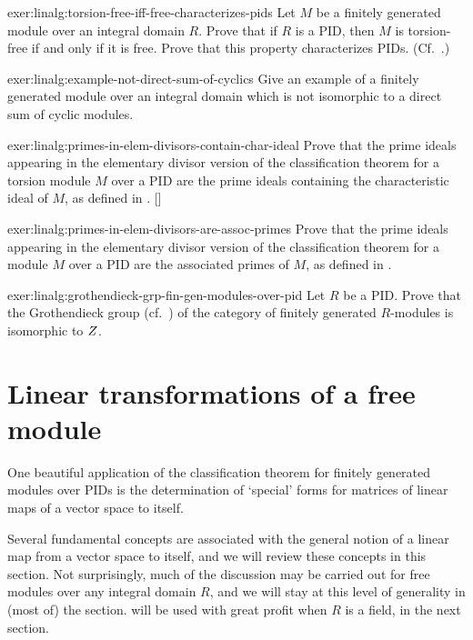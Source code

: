 \begin{exer}{}{exer:linalg:torsion-free-iff-free-characterizes-pids}
  Let $M$ be a finitely generated module over an integral domain $R$.
  Prove that if $R$ is a PID, then $M$ is torsion-free if and only if
  it is free. Prove that this property characterizes PIDs. (Cf.\
  .)
\end{exer}
\begin{exer}{}{exer:linalg:example-not-direct-sum-of-cyclics}
  Give an example of a finitely generated module over an integral
  domain which is not isomorphic to a direct sum of cyclic modules.
\end{exer}
\begin{exer}{\exerused}{exer:linalg:primes-in-elem-divisors-contain-char-ideal}
  Prove that the prime ideals appearing in the elementary divisor
  version of the classification theorem for a torsion module $M$ over
  a PID are the prime ideals containing the characteristic ideal of
  $M$, as defined in
  . []
\end{exer}
\begin{exer}{}{exer:linalg:primes-in-elem-divisors-are-assoc-primes}
  Prove that the prime ideals appearing in the elementary divisor
  version of the classification theorem for a module $M$ over a PID
  are the associated primes of $M$, as defined in
  .
\end{exer}
\begin{exer}{}{exer:linalg:grothendieck-grp-fin-gen-modules-over-pid}
  Let $R$ be a PID. Prove that the Grothendieck group (cf.\
  )
  of the category of finitely generated $R$-modules is isomorphic to
  $Z$.
\end{exer}

\section{Linear transformations of a free module}
\label{sec:linalg:linear-transformations-of-a-free-module}


One beautiful application of the classification theorem for finitely
generated modules over PIDs is the determination of `special' forms
for matrices of linear maps of a vector space to itself.

Several fundamental concepts are associated with the general notion of
a linear map from a vector space to itself, and we will review these
concepts in this section. Not surprisingly, much of the discussion may
be carried out for free modules over any integral domain $R$, and we
will stay at this level of generality in (most of) the section.
\Cref{thm:linalg:structure-theorem-fg-modules-over-pid} will be used with great profit when $R$ is a field,
in the next section.

